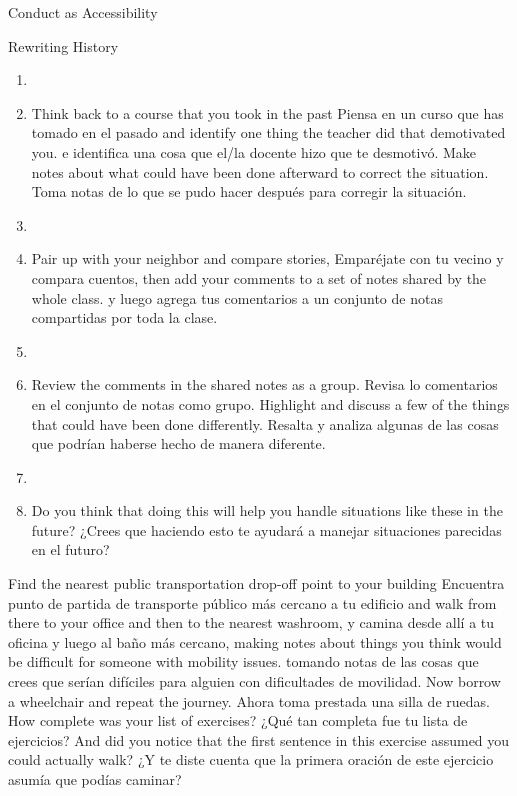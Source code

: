 \begin{aside}{Conduct as Accessibility}
\begin{aside}{Rewriting History}

\begin{enumerate}
\item
\item
  Think back to a course that you took in the past
  Piensa en un curso que has tomado en el pasado
  and identify one thing the teacher did that demotivated you.
  e identifica una cosa que el/la docente hizo que te desmotivó.
  Make notes about what could have been done afterward to correct the situation.
  Toma notas de lo que se pudo hacer después para corregir la situación.
\item
\item
  Pair up with your neighbor and compare stories,
  Emparéjate con tu vecino y compara cuentos,
  then add your comments to a set of notes shared by the whole class.
  y luego agrega tus comentarios a un conjunto de notas compartidas por toda la clase.
\item
\item
  Review the comments in the shared notes as a group.
  Revisa lo comentarios en el conjunto de notas como grupo.
  Highlight and discuss a few of the things that could have been done differently.
  Resalta y analiza algunas de las cosas que podrían haberse hecho de manera diferente.
\item
\item
  Do you think that doing this will help you handle situations like these in the future?
  ¿Crees que haciendo esto te ayudará a manejar situaciones parecidas en el futuro?
\end{enumerate}


Find the nearest public transportation drop-off point to your building
Encuentra punto de partida de transporte público más cercano a tu edificio
and walk from there to your office and then to the nearest washroom,
y camina desde allí a tu oficina y luego al baño más cercano,
making notes about things you think would be difficult for someone with mobility issues.
tomando notas de las cosas que crees que serían difíciles para alguien con dificultades de movilidad.
Now borrow a wheelchair and repeat the journey.
Ahora toma prestada una silla de ruedas.
How complete was your list of exercises?
¿Qué tan completa fue tu lista de ejercicios?
And did you notice that the first sentence in this exercise assumed you could actually walk?
¿Y te diste cuenta que la primera oración de este ejercicio asumía que podías caminar?


\end{aside}
\end{aside}
